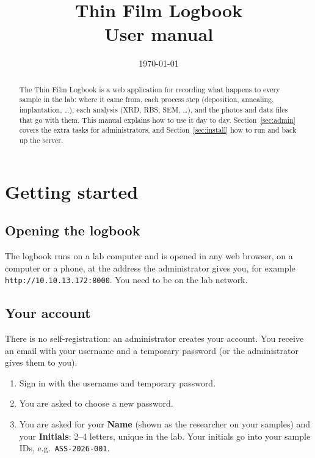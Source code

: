 \documentclass[11pt,a4paper]{article}
\title{\color{accent}\textbf{Thin Film Logbook}\\[4pt]\large User manual}
\author{}
\date{\today}
\newcommand{\ui}[1]{\textsf{\textbf{#1}}}
\newcommand{\sid}[1]{\texttt{#1}}
\begin{document}
\maketitle
\thispagestyle{empty}

\begin{abstract}
The Thin Film Logbook is a web application for recording what happens to
every sample in the lab: where it came from, each process step
(deposition, annealing, implantation, \ldots), each analysis (XRD, RBS,
SEM, \ldots), and the photos and data files that go with them. This manual
explains how to use it day to day. Section~\ref{sec:admin} covers the
extra tasks for administrators, and Section~\ref{sec:install} how to run
and back up the server.
\end{abstract}

\tableofcontents
\newpage

\section{Getting started}

\subsection{Opening the logbook}

The logbook runs on a lab computer and is opened in any web browser, on a
computer or a phone, at the address the administrator gives you, for
example \texttt{http://10.10.13.172:8000}. You need to be on the lab
network.

\subsection{Your account}

There is no self-registration: an administrator creates your account. You
receive an email with your username and a temporary password (or the
administrator gives them to you).

\begin{enumerate}
  \item Sign in with the username and temporary password.
  \item You are asked to choose a new password.
  \item You are asked for your \ui{Name} (shown as the researcher on your
        samples) and your \ui{Initials}: 2--4 letters, unique in the lab.
        Your initials go into your sample IDs, e.g.\ \sid{ASS-2026-001}.
\end{enumerate}
\end{document}
